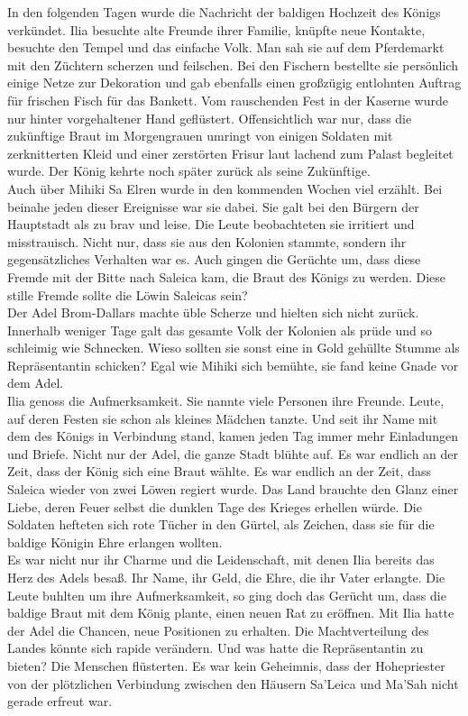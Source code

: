 In den folgenden Tagen wurde die Nachricht der baldigen Hochzeit des Königs verkündet. Ilia 
besuchte alte Freunde ihrer Familie, knüpfte neue Kontakte, besuchte den Tempel und das einfache 
Volk. Man sah sie auf dem Pferdemarkt mit den Züchtern scherzen und feilschen. Bei den Fischern 
bestellte sie persönlich einige Netze zur Dekoration und gab ebenfalls einen großzügig entlohnten 
Auftrag für frischen Fisch für das Bankett. Vom rauschenden Fest in der Kaserne wurde nur hinter 
vorgehaltener Hand geflüstert. Offensichtlich war nur, dass die zukünftige Braut im Morgengrauen 
umringt von einigen Soldaten mit zerknitterten Kleid und einer zerstörten Frisur laut lachend zum 
Palast begleitet wurde. Der König kehrte noch später zurück als seine Zukünftige.\\
Auch über Mihiki Sa Elren wurde in den kommenden Wochen viel erzählt. Bei beinahe jeden dieser 
Ereignisse war sie dabei. Sie galt bei den Bürgern der Hauptstadt als zu brav und leise. Die Leute 
beobachteten sie irritiert und misstrauisch. Nicht nur, dass sie aus den Kolonien stammte, sondern 
ihr gegensätzliches Verhalten war es. Auch gingen die Gerüchte um, dass diese Fremde mit der Bitte 
nach Saleica kam, die Braut des Königs zu werden. Diese stille Fremde sollte die Löwin 
Saleicas sein?\\
Der Adel Brom-Dallars machte üble Scherze und hielten sich nicht zurück. Innerhalb weniger Tage 
galt das gesamte Volk der Kolonien als prüde und so schleimig wie Schnecken. Wieso sollten sie 
sonst eine in Gold gehüllte Stumme als Repräsentantin schicken? Egal wie Mihiki sich bemühte, sie 
fand keine Gnade vor dem Adel.\\
Ilia genoss die Aufmerksamkeit. Sie nannte viele Personen ihre Freunde. Leute, auf deren Festen sie 
schon als kleines Mädchen tanzte. Und seit ihr Name mit dem des Königs in Verbindung stand, kamen 
jeden Tag immer mehr Einladungen und Briefe. Nicht nur der Adel, die ganze Stadt blühte auf. Es war 
endlich an der Zeit, dass der König sich eine Braut wählte. Es war endlich an der Zeit, dass 
Saleica wieder von zwei Löwen regiert wurde. Das Land brauchte den Glanz einer Liebe, deren Feuer 
selbst die dunklen Tage des Krieges erhellen würde. Die Soldaten hefteten sich rote Tücher in den 
Gürtel, als Zeichen, dass sie für die baldige Königin Ehre erlangen wollten.\\
Es war nicht nur ihr Charme und die Leidenschaft, mit denen Ilia bereits das Herz des Adels besaß. 
Ihr Name, ihr Geld, die Ehre, die ihr Vater erlangte. Die Leute buhlten um ihre Aufmerksamkeit, so 
ging doch das Gerücht um, dass die baldige Braut mit dem König plante, einen neuen Rat zu eröffnen. 
Mit Ilia hatte der Adel die Chancen, neue Positionen zu erhalten. Die Machtverteilung des Landes 
könnte sich rapide verändern. Und was hatte die Repräsentantin zu bieten? Die Menschen flüsterten. 
Es war kein Geheimnis, dass der Hohepriester von der plötzlichen Verbindung zwischen den Häusern 
Sa'Leica und Ma'Sah nicht gerade erfreut war.\\


